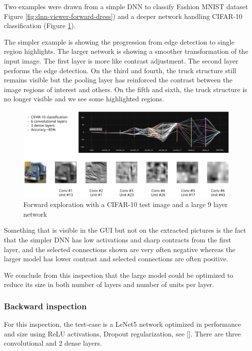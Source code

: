 Two examples were drawn from a simple DNN to classify Fashion MNIST dataset Figure \ref{fig:dnn-viewer-forward-dress}) and a deeper network handling CIFAR-10 classification (Figure \ref{fig:dnn-viewer-forward-truck}).

The simpler example is showing the progression from edge detection to single region highlights. The larger network is showing a smoother transformation of the input image. The first layer is more like contrast adjustment. The second layer performs the edge detection. On the third and fourth, the truck structure still remains visible but the pooling layer has reinforced the contrast between the image regions of interest and others. On the fifth and sixth, the truck structure is no longer visible and we see some highlighted regions.

\begin{figure}[H]
    \centering
    \includegraphics[scale=0.4]{images/dnn-viewer/TruckForward-Large.png}
    \caption{Forward exploration with a CIFAR-10 test image and a large 9 layer network}
    \label{fig:dnn-viewer-forward-truck}
\end{figure}

Something that is visible in the GUI but not on the extracted pictures is the fact that the simpler DNN has low activations and sharp contracts from the first layer, and the selected connections shown are very often negative whereas the larger model has lower contrast and selected connections are often positive.

We conclude from this inspection that the large model could be optimized to reduce its size in both number of layers and number of units per layer.

\subsubsection{Backward inspection}

For this inspection, the test-case is a LeNet5 network optimized in performance and size using ReLU activations, Dropout regularization, see [\cite{lenet5-optimized}]. There are three convolutional and 2 dense layers. 

